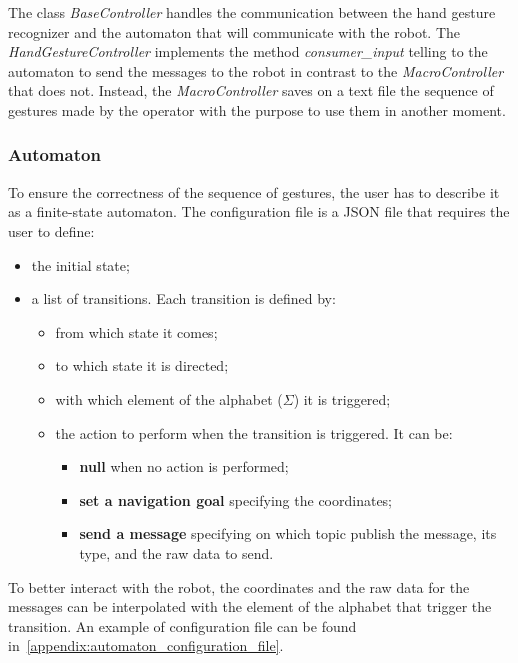 \documentclass[../thesis.tex]{subfiles}
\begin{document}
The class \textit{BaseController} handles the communication between the hand gesture recognizer and the automaton that will communicate with the robot. The \textit{HandGestureController} implements the method \textit{consumer\_input} telling to the automaton to send the messages to the robot in contrast to the \textit{MacroController} that does not. Instead, the \textit{MacroController} saves on a text file the sequence of gestures made by the operator with the purpose to use them in another moment.

\subsubsection{Automaton}\label{sss:automaton_methodology}
To ensure the correctness of the sequence of gestures, the user has to describe it as a finite-state automaton. The configuration file is a JSON file that requires the user to define:
\begin{itemize}
    \item the initial state;
    \item a list of transitions. Each transition is defined by:
    \begin{itemize}
        \item from which state it comes;
        \item to which state it is directed;
        \item with which element of the alphabet ($\Sigma$) it is triggered;
        \item the action to perform when the transition is triggered. It can be:
        \begin{itemize}
            \item \textbf{null} when no action is performed;
            \item \textbf{set a navigation goal} specifying the coordinates;
            \item \textbf{send a message} specifying on which topic publish the message, its type, and the raw data to send.
        \end{itemize}
    \end{itemize}
\end{itemize}
To better interact with the robot, the coordinates and the raw data for the messages can be interpolated with the element of the alphabet that trigger the transition. An example of configuration file can be found in~\ref{appendix:automaton_configuration_file}.\\
\end{document}
